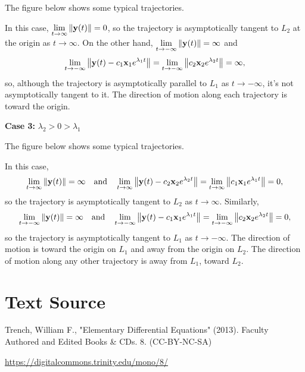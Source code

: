 \documentclass{ximera}
\begin{document}
The figure below shows
some typical trajectories.

\begin{center}
\end{center}


In this case, $\lim_{t\rightarrow\infty}\norm{{\bf y}(t)}=0$, so the trajectory is
asymptotically tangent to $L_2$ at the origin as $t\rightarrow\infty$. On the
other hand, $\lim_{t\rightarrow-\infty}\norm{{\bf y}(t)}=\infty$ and
$$
\lim_{t\rightarrow-\infty}\norm{{\bf y}(t)-c_1{\bf x}_1e^{\lambda_1
t}}=\lim_{t\rightarrow-\infty}\norm{c_2{\bf x}_2e^{\lambda_2t}}=\infty,
$$
so, although the trajectory is asymptotically parallel to $L_1$ as
$t\rightarrow-\infty$, it's not asymptotically tangent to it.
The direction of motion along each trajectory is toward the origin.

{\bf Case 3:} $\lambda_2>0>\lambda_1$

The figure below shows
some typical trajectories.

\begin{center}
\end{center}


In this case,
$$
\lim_{t\rightarrow\infty}\norm{{\bf y}(t)}=\infty \quad\mbox{and}\quad
\lim_{t\rightarrow\infty}\norm{{\bf y}(t)-c_2{\bf x}_2e^{\lambda_2
t}}=\lim_{t\rightarrow\infty}\norm{c_1{\bf x}_1e^{\lambda_1t}}=0,
$$
so the trajectory is asymptotically tangent to $L_2$ as $t\rightarrow\infty$.
Similarly,
$$
\lim_{t\rightarrow -\infty}\norm{{\bf y}(t)}=\infty \quad\mbox{and}\quad
\lim_{t\rightarrow -\infty}\norm{{\bf y}(t)-c_1{\bf x}_1e^{\lambda_1
t}}=\lim_{t\rightarrow -\infty}\norm{c_2{\bf x}_2e^{\lambda_2t}}=0,
$$
so the trajectory is asymptotically tangent to $L_1$ as $t\rightarrow-\infty$.
The direction of motion is toward the origin on $L_1$ and away from
the origin on $L_2$. The direction of motion along any other
trajectory is away from $L_1$, toward $L_2$.




\section*{Text Source}
Trench, William F., "Elementary Differential Equations" (2013). Faculty Authored and Edited Books \& CDs. 8. (CC-BY-NC-SA)

\href{https://digitalcommons.trinity.edu/mono/8/}{https://digitalcommons.trinity.edu/mono/8/}
\end{document}
